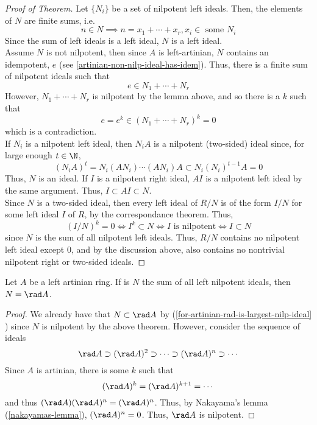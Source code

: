 \documentclass[11pt,leqno,oneside]{amsbook}
\numberwithin{thm}{section}
\begin{document}
\begin{proof}[Proof of Theorem]
  Let \(\{N_i\}\) be a set of nilpotent left ideals. Then, the
  elements of \(N\) are finite sums, i.e. \[
    n \in N \implies n = x_1 + \cdots + x_r, x_i \in \text{ some }N_i
  \]
  Since the sum of left ideals is a left ideal, \(N\) is a left
  ideal. \\

  Assume \(N\) is not nilpotent, then since \(A\) is left-artinian,
  \(N\) contains an idempotent, \(e\)
  (see \ref{artinian-non-nilp-ideal-has-idem}). Thus, there is a finite sum
  of nilpotent ideals such that \[
    e \in N_1 + \cdots + N_r
  \]
  However, \(N_1 + \cdots + N_r\) is nilpotent by the lemma above, and
  so there is a \(k\) such that \[
    e = e^k \in (N_1 + \cdots + N_r)^k = 0
  \]
  which is a contradiction. \\

  If \(N_i\) is a nilpotent left ideal, then \(N_i A\) is a nilpotent
  (two-sided) ideal since, for large enough \(t \in \N\), \[
    (N_i A)^t = N_i(A N_i) \cdots (A N_i) A \subset N_i (N_i)^{t-1}A = 0
  \]
  Thus, \(N\) is an ideal.  If
  \(I\) is a nilpotent right ideal, \(AI\) is a nilpotent left ideal
  by the same argument. Thus, \(I \subset AI \subset N\). \\

  Since \(N\) is a two-sided ideal, then every left ideal of \(R/N\)
  is of the form \(I/N\) for some left ideal \(I\) of \(R\), by the
  correspondance theorem. Thus, \[
    (I/N)^k = 0 \iff I^k \subset N \iff I
    \text{ is nilpotent} \iff I \subset N
  \]
  since \(N\) is the sum of all nilpotent left ideals. Thus, \(R/N\)
  contains no nilpotent left ideal except \(0\), and by the discussion
  above, also contains no nontrivial nilpotent right or two-sided ideals.
\end{proof}
\begin{thm}
  Let \(A\) be a left artinian ring. If is \(N\) the sum of all
  left nilpotent ideals, then \(N = \rad A\).
  \begin{proof}
    We already have that \(N \subset \rad A\) by
    (\ref{for-artinian-rad-is-largest-nilp-ideal} ) since \(N\) is
    nilpotent by the above theorem. However, consider the sequence of
    ideals \[
      \rad A \supset (\rad A)^2 \supset \cdots \supset (\rad A)^n
      \supset \cdots
    \]
    Since \(A\) is artinian, there is some \(k\) such that \[
      (\rad A)^k = (\rad A)^{k+1} = \cdots
    \]
    and thus \((\rad A)(\rad A)^n = (\rad A)^n\). Thus, by Nakayama's
    lemma (\ref{nakayamas-lemma}), \((\rad A)^n = 0\). Thus, \(\rad
    A\) is nilpotent.
  \end{proof}
\end{thm}
\end{document}
